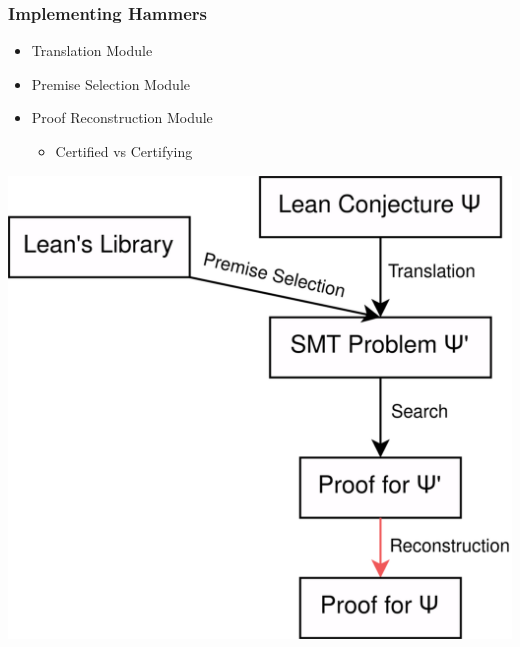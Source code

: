 \documentclass[usepdftitle=false,aspectratio=169,usenames,dvipsnames]{beamer}
\newcommand\vitem{\vfill\item}
\begin{document}


\begin{frame}
  \frametitle{Implementing Hammers}
  \begin{minipage}[c][0.55 \textheight]{0.45 \textwidth}
    \begin{itemize}
      \item Translation Module
      \vitem Premise Selection Module
      \vitem Proof Reconstruction Module
      \begin{itemize}
        \item{Certified vs Certifying}
      \end{itemize}
    \end{itemize}
  \end{minipage}
  \begin{minipage}{0.44 \textwidth}
    \centering
    \includegraphics[height=0.65\textheight]{images/pic5.png}
  \end{minipage}
\end{frame}
\end{document}
